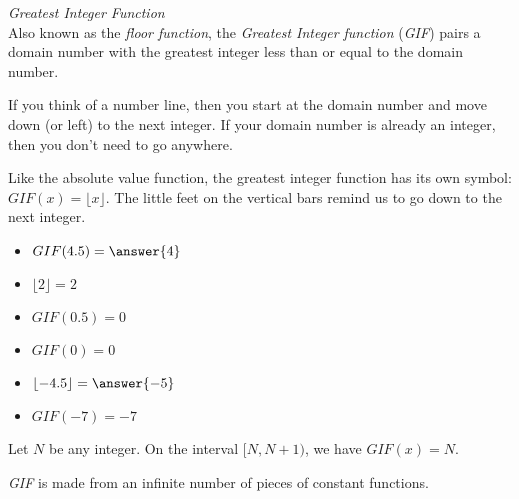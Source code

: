 \documentclass{ximera}
\begin{document}
\begin{example} \textit{Greatest Integer Function} \\
Also known as the \textit{floor function}, the \textit{Greatest Integer function} (\textit{GIF}) pairs a domain number with the greatest integer less than or equal to the domain number.

If you think of a number line, then you start at the domain number and move down (or left) to the next integer.  If your domain number is already an integer, then you don't need to go anywhere.


Like the absolute value function, the greatest integer function has its own symbol:  $GIF(x) = \lfloor x \rfloor$. The little feet on the vertical bars remind us to go down to the next integer.

\begin{itemize}
\item $GIF(4.5) = \answer{4}$
\item $\lfloor 2 \rfloor = 2$
\item $GIF(0.5) = 0$
\item $GIF(0) = 0$
\item $\lfloor -4.5 \rfloor = \answer{-5}$
\item $GIF(-7) = -7$
\end{itemize}




Let $N$ be any integer. On the interval $[N, N+1)$, we have $GIF(x) = N$.

\textit{GIF} is made from an infinite number of pieces of constant functions.







\end{example}
\end{document}
